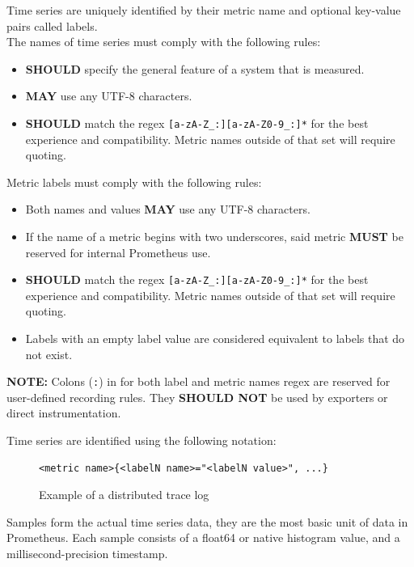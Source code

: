 Time series are uniquely identified by their metric name and optional key-value pairs called labels.\\
The names of time series must comply with the following rules:

\begin{itemize}
    \item \textbf{SHOULD} specify the general feature of a system that is measured.
    \item \textbf{MAY} use any UTF-8 characters.
    \item \textbf{SHOULD} match the regex \texttt{[a-zA-Z\_:][a-zA-Z0-9\_:]*} for the best experience and
    compatibility.
    Metric names outside of that set will require quoting.
\end{itemize}

Metric labels must comply with the following rules:

\begin{itemize}
    \item Both names and values \textbf{MAY} use any UTF-8 characters.
    \item If the name of a metric begins with two underscores, said metric \textbf{MUST} be reserved for internal
    Prometheus use.
    \item \textbf{SHOULD} match the regex \texttt{[a-zA-Z\_:][a-zA-Z0-9\_:]*} for the best experience and
    compatibility.
    Metric names outside of that set will require quoting.
    \item Labels with an empty label value are considered equivalent to labels that do not exist.
\end{itemize}


\medskip
\noindent
\textbf{NOTE:} Colons (\texttt{:}) in for both label and metric names regex are reserved for user-defined recording
rules.
They \textbf{SHOULD NOT} be used by exporters or direct instrumentation.

Time series are identified using the following notation:
\begin{figure}[h]
    \centering
    \begin{lstlisting}
<metric name>{<labelN name>="<labelN value>", ...}
    \end{lstlisting}
    \caption{Example of a distributed trace log}
\end{figure}

Samples form the actual time series data, they are the most basic unit of data in Prometheus.
Each sample consists of a float64 or native histogram value, and a millisecond-precision timestamp.\\

